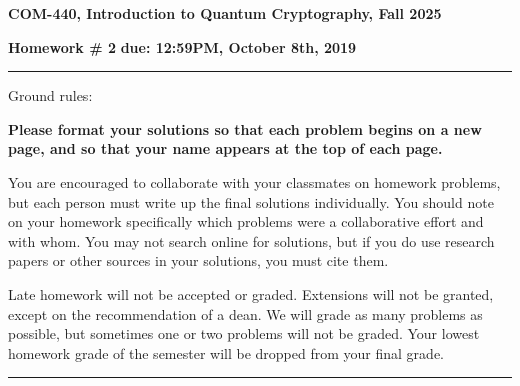 \documentclass[12pt]{article}
\newcommand{\header}[1]{\begin{center} {\large\bf #1} \end{center}}
\begin{document}
\header{COM-440, Introduction to Quantum Cryptography, Fall 2025}
{\bf Homework \# 2} \hfill {\bf due: 12:59PM, October 8th, 2019}


\medskip

\hrule

\medskip 

Ground rules: 

{\bf Please
  format your solutions so that each problem begins on a new page, and
  so that your name appears at the top of each page.}

You are encouraged to collaborate with your classmates on
homework problems, but each person must write up the final solutions
individually. You should note on your homework specifically which
problems were a collaborative effort and with whom. You may not search
online for solutions, but if you do use research papers or other
sources in your solutions, you must cite them.

Late homework will not be accepted or graded. Extensions will not be granted, except on the recommendation of a dean. We will grade as many problems as possible, but sometimes one or two problems will not be graded. Your lowest homework grade of the semester will be dropped from your final grade.


\medskip

\hrule
\end{document}
